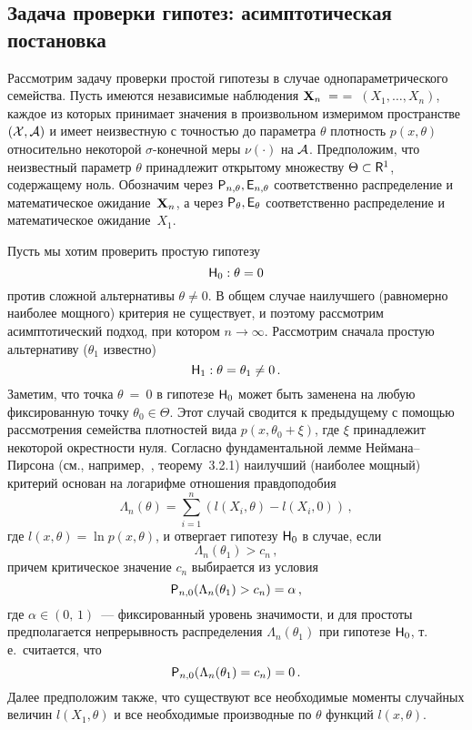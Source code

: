 \begin{multicols}{2}
\section{Задача проверки гипотез: асимптотическая постановка}

Рассмотрим задачу проверки простой гипотезы в случае
однопараметрического семейства. Пусть имеются независимые наблюдения
${\bf X}_n\;=$\linebreak $=\;(X_1,\ldots,X_n)$, каждое из которых принимает
значения в произвольном измеримом пространстве $(\cal{X},\cal{A})$ и
имеет неизвестную с точностью до параметра $\theta$ плотность
$p(x,\theta)$ относительно некоторой $\sigma$-конечной меры
$\nu(\cdot)$ на $\cal{A}$. Предположим, что неизвестный параметр
$\theta$ принадлежит открытому множеству $\Theta\subset{\sf R}^1$,
содержащему ноль. Обозначим через ${{\sf P}}_{n,\theta}, {{\sf E}}_{n,\theta}$
соответственно распределение и математическое ожидание~${\bf X}_n$, 
а через ${{\sf P}}_{\theta}, {{\sf E}}_{\theta}$
соответственно распределение и математическое ожидание~$X_1$.

Пусть мы хотим проверить простую гипотезу
\begin{equation}
 {\sf H}_0:\theta=0
\label{6.1b}
\end{equation}
против сложной альтернативы $\theta\ne 0$. В
общем случае наилучшего (равномерно наиболее мощного) критерия не
существует, и поэтому рассмотрим асимптотический подход, при
котором $n\to\infty$. Рассмотрим сначала простую альтернативу
($\theta_1$ известно)
\begin{equation}
{\sf H}_1:\theta = \theta_1\ne0\,.
\label{6.2b}
\end{equation}
Заметим, что точка $\theta\:=\:0$ в гипотезе ${\sf H}_0$
может быть заменена на любую фиксированную точку
$\theta_0\in\Theta$. Этот случай сводится к предыдущему с помощью
рассмотрения семейства плотностей вида $p(x,\theta_0+\xi)$,
где $\xi$ принадлежит некоторой окрестности нуля. Согласно
фундаментальной лемме Неймана--Пирсона (см., например,~\cite{46be},
теорему~3.2.1) наилучший (наиболее мощный) критерий основан на
логарифме отношения правдоподобия
\begin{equation}
\Lambda_n(\theta) =
\sum_{i=1}^{n}(l(X_i,\theta)-l(X_i,0))\,,
\label{6.3b}
\end{equation}
где $l(x,\theta) = \ln p(x,\theta)$, и отвергает гипотезу ${\sf H}_0$
в случае, если
$$
\Lambda_n(\theta_1) > c_n\,,
$$
причем критическое значение $c_n$ выбирается из условия
\begin{equation}
{{\sf P}}_{n,0}(\Lambda_n(\theta_1)>c_n) = \alpha\,,
\label{6.4b}
\end{equation}
где $\alpha\in(0,\,1)$~--- фиксированный уровень значимости, и
для простоты предполагается непрерывность распределения
$\Lambda_n(\theta_1)$ при гипотезе ${\sf H}_0$, т.\,е.\ считается,
что
$$
{{\sf P}}_{n,0}(\Lambda_n(\theta_1)=c_n) = 0\,.
$$
Далее предположим также, что существуют все необходимые моменты
случайных величин $l(X_1,\theta)$ и все необходимые производные по
$\theta$ функций $l(x,\theta)$.


\end{multicols}
